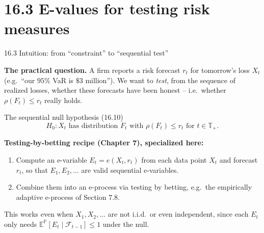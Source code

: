 \documentclass[aspectratio=169,10pt]{beamer}
\newcommand{\PP}{\mathbb{P}}
\newcommand{\EE}{\mathbb{E}}
\newcommand{\1}{\mathbb{1}}
\begin{document}
\section{16.3 E-values for testing risk measures}

\begin{frame}{16.3 Intuition: from ``constraint'' to ``sequential test''}

\textbf{The practical question.} A firm reports a risk forecast $r_t$ for tomorrow's loss $X_t$ (e.g.\ ``our $95\%$ VaR is $\$3$ million''). We want to \emph{test}, from the sequence of realized losses, whether these forecasts have been honest -- i.e.\ whether $\rho(F_t) \le r_t$ really holds.

\begin{block}{The sequential null hypothesis (16.10)}
\[
H_0 : X_t \text{ has distribution } F_t \text{ with } \rho(F_t) \le r_t \text{ for } t \in \mathbb T_+.
\]
\end{block}

\textbf{Testing-by-betting recipe (Chapter 7), specialized here:}
\begin{enumerate}
\item Compute an e-variable $E_t = e(X_t, r_t)$ from each data point $X_t$ and forecast $r_t$, so that $E_1, E_2, \dots$ are valid sequential e-variables.
\item Combine them into an e-process via testing by betting, e.g.\ the empirically adaptive e-process of Section 7.8.
\end{enumerate}
This works even when $X_1, X_2, \dots$ are not i.i.d.\ or even independent, since each $E_t$ only needs $\EE^{\PP}[E_t \mid \mathcal F_{t-1}] \le 1$ under the null.

\end{frame}
\end{document}
